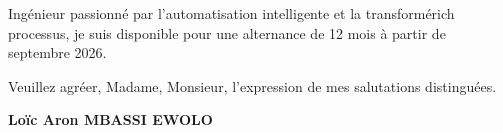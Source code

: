 \documentclass[a4paper,11pt]{article}
\begin{document}
\vspace{0.8em}

Ing\'enieur passionn\'e par l'automatisation intelligente et la transform\'erich processus, je suis disponible pour une alternance de 12 mois \`a partir de septembre 2026.

\vspace{1.5em}
\noindent Veuillez agr\'eer, Madame, Monsieur, l'expression de mes salutations distingu\'ees.

\vspace{2em}
\noindent \textbf{Lo\"ic Aron MBASSI EWOLO}
\end{document}
